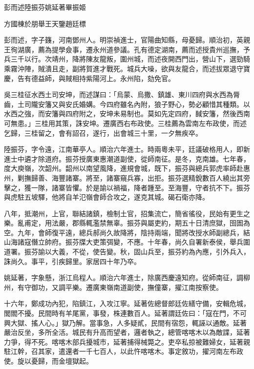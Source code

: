 
\begin{pinyinscope}
彭而述陸振芬姚延著畢振姬

方國棟於朋舉王天鑒趙廷標

彭而述，字子籛，河南鄧州人。明崇禎進士，官陽曲知縣，母憂歸。順治初，英親王徇湖廣，薦為提學僉事，遷永州道參議。孔有德定湖南，薦而述授貴州巡撫，予兵三千以行。次靖州，降將陳友龍叛，圍州城，而述夜開西門出，營山下，選勁騎乘霧沖陣，賊潰且走，副將賀進才戰死。城兵大噪，欲與友龍合，而述拔眾退守寶慶，告有德益師，與賊相持紫陽河上。永州陷，劾免官。

吳三桂征水西土司安坤，而述謀曰：「烏蒙、烏撒、鎮雄、東川四府與水西為脣齒，土司隴安籓又與安氏婚媾。今四府雖名內附，狼子野心，勢必顧惜其種類。以水西之強，而安籓與四府附之，安坤未易制也。莫如先定四府，馘安籓，然後西南可無患。」三桂用其策，誅安坤。遷廣西右布政使。三桂薦為雲南左布政使，而述乞歸，三桂留之，會有詔召，遂行，出會城三十里，一夕無疾卒。

陸振芬，字令遠，江南華亭人。順治六年進士。時兩粵未平，廷議破格用人，即新進士中遴才除道府。振芬授廣東惠潮道副使，從師南征。是冬，克南雄。七年春，度大庾嶺，次韶州。韶州以南望風降，進規會城，既下，振芬與總兵郭虎率師赴惠州，剿撫歸善、海豐諸寨。將至，諸寨窺兵寡，出拒。振芬選精銳數百人繞出其旁擊之，獲一隊，諸寨皆懼。於是諭以禍福，降者踵至。至海豐，守者抗不下。振芬與虎駐五坡驛，他將自羊氾嶺會師合攻之，遂克其城。碣石衛亦降。

八年，抵潮州，上官，聯結諸鎮，檢制土官，招集流亡，簡省徭役，民始有更生之樂。亂甫定，用法嚴，郡縣輒濫禁無辜。振芬與屬吏約，期五十日清庶獄，囹圄為空。九年，會師復平遠，總兵郝尚久故降將，陰持兩端，聞將改授水師副總兵，結山海諸寇僭立帥府。振芬牒大吏策弭變，不應。十年春，尚久自署新泰侯，舉兵圍道署。振芬諭以大義，不從，使告變。秋，固山兵至，振芬約為內應，引外兵入，誅尚久。事平，引疾歸里。家居四十年乃卒。

姚延著，字象懸，浙江烏程人。順治六年進士，除廣西慶遠知府。從師南征，調柳州，有守御功，又調平樂。遷廣東嶺南道副使，撫僮寨，擢江南按察使。

十六年，鄭成功內犯，陷鎮江，入攻江寧。延著佐總督郎廷佐繕守備，安輯危城，閭閻不擾。民間時有羊尾黨，事發，株連數百人。延著謂廷佐曰：「寇在門，不可興大獄、搖人心。」獄乃解。當事急，人多疑貳，民間有宿怨，輒誣以通敵。延著嚴治反坐，多所全活。城民有升高而望者，邏者執之，總管喀喀木以為敵諜，延著力爭，得不死。喀喀木部兵擾城市，延著捕得械斃之。吏卒私掠被難婦女，延著親駐江幹，召其家，遣還者一千七百人，以此忤喀喀木。事定敘功，擢河南左布政使。旋以憂歸，而金壇獄起。


\end{pinyinscope}
